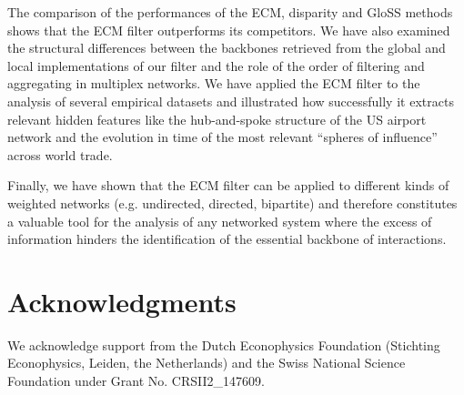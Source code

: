 \documentclass[aps,twocolumn,superscriptaddress]{revtex4-1}
\newcommand{\gloss}{GloSS }
\begin{document}
The comparison of the performances of the ECM, disparity and \gloss methods shows that the ECM filter outperforms its competitors. We have also examined the structural differences between the backbones retrieved from the global and local implementations of our filter and the role of the order of filtering and aggregating in multiplex networks. 
We have applied the ECM filter to the analysis of several empirical datasets and illustrated how successfully it extracts relevant hidden features like the hub-and-spoke structure of the US airport network and the evolution in time of the most relevant ``spheres of influence'' across world trade. 

Finally, we have shown that the ECM filter can be applied to different kinds of weighted networks (e.g. undirected, directed, bipartite) and therefore constitutes a valuable tool for the analysis of any networked system where the excess of information hinders the identification of the essential backbone of interactions.



\section*{Acknowledgments}
We acknowledge support from the Dutch Econophysics Foundation (Stichting Econophysics, Leiden, the Netherlands) and the Swiss National Science Foundation under Grant No. CRSII2\_147609.
\end{document}
